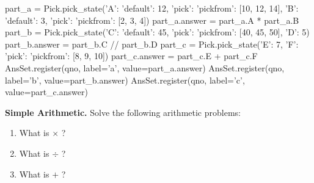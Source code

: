 \begin{pycode}
part_a = Pick.pick_state({'A': {'default': 12, 'pick': {'pickfrom': [10, 12, 14]}},
                          'B': {'default': 3,  'pick': {'pickfrom': [2, 3, 4]}}})
part_a.answer = part_a.A * part_a.B
part_b = Pick.pick_state({'C': {'default': 45, 'pick': {'pickfrom': [40, 45, 50]}},
                          'D': 5})
part_b.answer = part_b.C // part_b.D
part_c = Pick.pick_state({'E': 7,
                          'F': {'pick': {'pickfrom': [8, 9, 10]}}})
part_c.answer = part_c.E + part_c.F
AnsSet.register(qno, label='a', value=part_a.answer)
AnsSet.register(qno, label='b', value=part_b.answer)
AnsSet.register(qno, label='c', value=part_c.answer)
\end{pycode}
\textbf{Simple Arithmetic.} Solve the following arithmetic problems:

\begin{enumerate}

\item[a.] What is  \(\times\) ?
\ifshowsolutions\ \ \ \textcolor{blue}{}
\else
\vspace{1cm}
\fi
\item[b.] What is  \(\div\) ?
\ifshowsolutions\ \ \ \textcolor{blue}{}
\else
\vspace{1cm}
\fi
\item[c.] What is  \(+\) ?
\ifshowsolutions\ \ \ \textcolor{blue}{}
\else
\vspace{1cm}
\fi

\end{enumerate}
